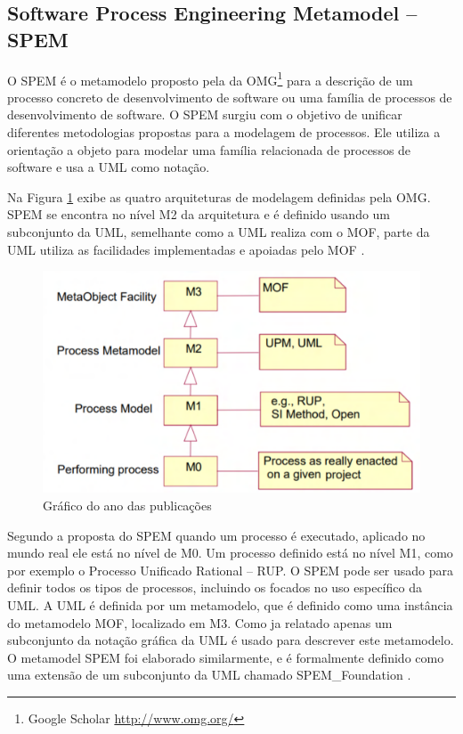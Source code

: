 \subsection{Software Process Engineering Metamodel -- SPEM}


O SPEM é o metamodelo proposto pela da OMG\footnote{Google Scholar \url{http://www.omg.org/}} para a descrição de um processo concreto de desenvolvimento de software ou uma família de processos de desenvolvimento de software. O SPEM surgiu com o objetivo de unificar diferentes metodologias propostas para a modelagem de processos. Ele utiliza a orientação a objeto para modelar uma família relacionada de processos de software e usa a UML como notação.

Na Figura \ref{fig:niveisSpem} exibe as quatro arquiteturas de modelagem definidas pela OMG. SPEM se encontra no nível M2 da arquitetura e é definido usando um subconjunto da UML, semelhante como a UML realiza com o MOF, parte da UML utiliza as facilidades implementadas e apoiadas pelo MOF \cite{genvigir2003modelagem}.  

\begin{figure}[!htb]
	\caption{Gráfico do ano das publicações}\label{fig:niveisSpem}
	\begin{center}
		\includegraphics[scale=0.5]{img/spemNiveis}
	\end{center}
\end{figure}

Segundo a proposta do SPEM quando um processo é executado, aplicado no mundo real ele está no nível de M0. Um processo definido está no nível M1, como por exemplo o Processo Unificado Rational -- RUP. O SPEM pode ser usado para definir todos os tipos de processos, incluindo os focados no uso específico da UML. A UML é definida por um metamodelo, que é definido como uma instância do metamodelo MOF, localizado em M3. Como ja relatado apenas um subconjunto da notação gráfica da UML é usado para descrever este metamodelo. O metamodel SPEM foi elaborado similarmente, e é formalmente definido como uma extensão de um subconjunto da UML chamado SPEM\_Foundation \cite{genvigir2003modelagem}. 
